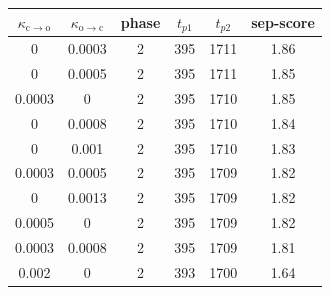 \begin{tabular}{@{}cccccc@{}}
\toprule
$\kappa_{\mathrm{c\to o}}$ & $\kappa_{\mathrm{o\to c}}$ & phase & $t_{p1}$ & $t_{p2}$ & sep-score \\
\midrule
0 & 0.0003 & 2 & 395 & 1711 & 1.86 \\
0 & 0.0005 & 2 & 395 & 1711 & 1.85 \\
0.0003 & 0 & 2 & 395 & 1710 & 1.85 \\
0 & 0.0008 & 2 & 395 & 1710 & 1.84 \\
0 & 0.001 & 2 & 395 & 1710 & 1.83 \\
0.0003 & 0.0005 & 2 & 395 & 1709 & 1.82 \\
0 & 0.0013 & 2 & 395 & 1709 & 1.82 \\
0.0005 & 0 & 2 & 395 & 1709 & 1.82 \\
0.0003 & 0.0008 & 2 & 395 & 1709 & 1.81 \\
0.002 & 0 & 2 & 393 & 1700 & 1.64 \\
\bottomrule
\end{tabular}
